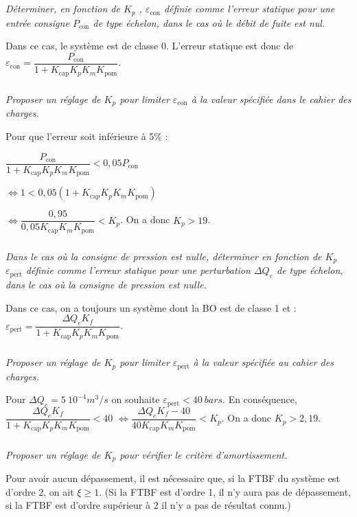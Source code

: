 \begin{multicols}{2}
\subparagraph{}
\textit{Déterminer, en fonction de $K_p$ , $\varepsilon_{\text{con}}$ définie comme l’erreur statique pour une entrée consigne $P_{\text{con}}$ de type échelon, dans le cas où le débit de fuite est nul.}
\ifprof
\begin{corrige}
Dans ce cas, le système est de classe 0. L'erreur statique est donc de $\varepsilon_{\text{con}}=\dfrac{P_{\text{con}}}{1+K_{\text{cap}}K_pK_mK_{\text{pom}}}$.
\end{corrige}
\else
\fi

\subparagraph{}
\textit{Proposer un réglage de $K_p$ pour limiter $\varepsilon_{\text{con}}$ à la valeur spécifiée dans le  cahier des charges.}
\ifprof
\begin{corrige}

Pour que l'erreur soit inférieure à 5\% : 

$\dfrac{P_{\text{con}}}{1+K_{\text{cap}}K_pK_mK_{\text{pom}}}<0,05 P_{\text{con}}$

$\Leftrightarrow 1<0,05 \left(1+K_{\text{cap}}K_pK_mK_{\text{pom}}\right)$

$\Leftrightarrow \dfrac{0,95}{0,05K_{\text{cap}}K_mK_{\text{pom}}}<K_p$.
On a donc $K_p>19$.
\end{corrige} 
\else
\fi

\subparagraph{}
\textit{Dans le cas où la consigne de pression est nulle,  déterminer en fonction de $K_p$  $\varepsilon_{\text{pert}}$ définie comme l’erreur statique pour une perturbation $\Delta Q_e$ de type échelon, dans le cas où la consigne de pression est nulle.}
\ifprof
\begin{corrige}
Dans ce cas, on a toujours un système dont la BO est de classe 1 et : 
$\varepsilon_{\text{pert}}=\dfrac{\Delta Q_e K_f}{1+K_{\text{cap}}K_pK_mK_{\text{pom}}}$.

\end{corrige}
\else
\fi

\subparagraph{}
\textit{Proposer un réglage de $K_p$ pour limiter $\varepsilon_{\text{pert}}$ à la valeur spécifiée au cahier des charges.}
\ifprof
\begin{corrige}
Pour $\Delta Q_e = \SI{5}{10^{-4} m^3/s}$ on souhaite $\varepsilon_{\text{pert}} < \SI{40}{bars}$. En conséquence, 
$\dfrac{\Delta Q_e K_f}{1+K_{\text{cap}}K_pK_mK_{\text{pom}}} <40$ 
$\Leftrightarrow  \dfrac{\Delta Q_e K_f -40}{40K_{\text{cap}}K_mK_{\text{pom}}}<K_p$. On a donc $K_p>2,19$.
\end{corrige}
\else
\fi

\subparagraph{}
\textit{Proposer un réglage de $K_p$ pour vérifier le critère d’amortissement.}
\ifprof
\begin{corrige}
Pour avoir aucun dépassement, il est nécessaire que, si la FTBF du système est d'ordre 2, on ait $\xi\geq 1$. (Si la FTBF est d'ordre 1, il n'y aura pas de dépassement, si la FTBF est d'ordre supérieur à 2 il n'y a pas de résultat connu.)


\end{corrige}
\end{multicols}
